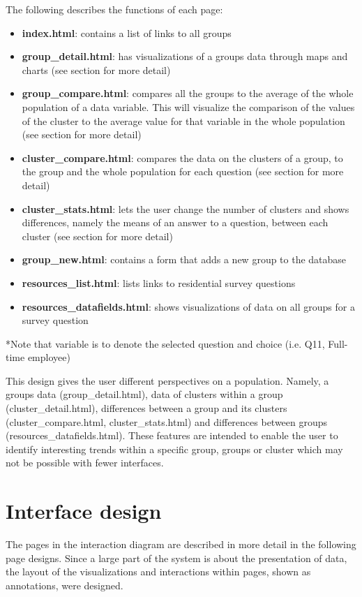 The following describes the functions of each page:
\begin{itemize}
  \item \textbf{index.html}: contains a list of links to all groups
  \item \textbf{group\_detail.html}: has visualizations of a group\textquotesingle s data through maps and charts (see section for more detail)
  \item \textbf{group\_compare.html}: compares all the groups to the average of the whole population of a data variable. This will visualize the comparison of the values of the cluster to the average value for that variable in the whole population (see section for more detail)
  \item \textbf{cluster\_compare.html}: compares the data on the clusters of a group, to the group and the whole population for each question (see section for more detail)
  \item \textbf{cluster\_stats.html}: lets the user change the number of clusters and shows differences, namely the means of an answer to a question, between each cluster (see section for more detail)
  \item \textbf{group\_new.html}: contains a form that adds a new group to the database
  \item \textbf{resources\_list.html}: lists links to residential survey questions
  \item \textbf{resources\_datafields.html}: shows visualizations of data on all groups for a survey question
\end{itemize}

*Note that variable is to denote the selected question and choice (i.e. Q11, Full-time employee) \par

This design gives the user different perspectives on a population. Namely, a group\textquotesingle s data (group\_detail.html), data of clusters within a group (cluster\_detail.html), differences between a group and its clusters (cluster\_compare.html, cluster\_stats.html) and differences between groups (resources\_datafields.html). These features are intended to enable the user to identify interesting trends within a specific group, groups or cluster which may not be possible with fewer interfaces. 

\section{Interface design}
The pages in the interaction diagram are described in more detail in the following page designs. Since a large part of the system is about the presentation of data, the layout of the visualizations and interactions within pages, shown as annotations, were designed.


